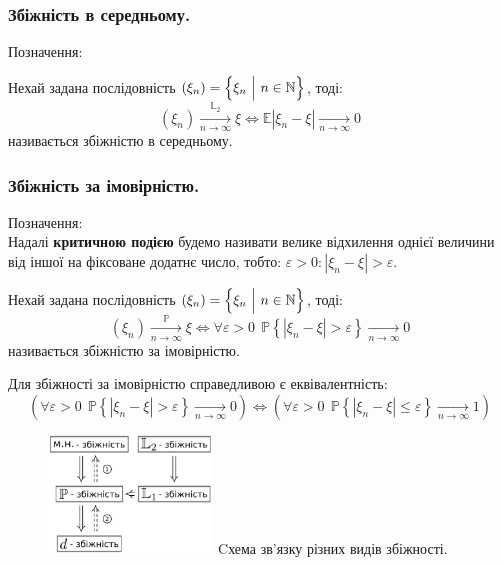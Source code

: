 \subsubsection{Збіжність в середньому.}
Позначення: 
\begin{defo} Нехай задана послідовність $(\xi_n) = \left\lbrace \xi_n \ \Big|\  n \in \mathbb{N} \right\rbrace$, тоді:
  $$
  (\xi_n) \xrightarrow[n \to \infty]{\mathbb{L}_2}\xi \Longleftrightarrow \mathbb{E} \left| \xi_n - \xi \right| \xrightarrow[n \to \infty]{} 0
  $$
  називається збіжністю в середньому.
\end{defo}
\subsubsection{Збіжність за імовірністю.}
Позначення: \\
Надалі \textbf{критичною подією} будемо називати велике відхилення однієї величини від іншої на фіксоване додатнє число, тобто: $\varepsilon  > 0 : \left| \xi_n - \xi \right| > \varepsilon $.
\begin{defo} Нехай задана послідовність $(\xi_n) = \left\lbrace \xi_n \ \Big|\  n \in \mathbb{N} \right\rbrace$, тоді:
  $$
  (\xi_n) \xrightarrow[n \to \infty]{\mathbb{P}}\xi \Longleftrightarrow
  \forall \varepsilon > 0 \ \
\mathbb{P} \left\lbrace   \left| \xi_n - \xi \right| > \varepsilon  \right\rbrace \xrightarrow[n\to\infty]{}0
  $$
  називається збіжністю за імовірністю.
\end{defo}
\begin{remark} Для збіжності за імовірністю справедливою є еквівалентність:
$$
\left( \forall \varepsilon > 0 \ \
\mathbb{P} \left\lbrace   \left| \xi_n - \xi \right| > \varepsilon  \right\rbrace \xrightarrow[n\to\infty]{}0 \right) \Longleftrightarrow \left( \forall \varepsilon  > 0 \ \
\mathbb{P} \left\lbrace   \left| \xi_n - \xi \right| \leq  \varepsilon  \right\rbrace \xrightarrow[n\to\infty]{}1 \right)
$$
\end{remark}
\begin{figure}
\centering
\vspace*{-1.5cm}
\includegraphics[width=0.39\textwidth]{assets/g11500.png}
{\small Cхема зв'язку різних видів збіжності.}
\end{figure}
